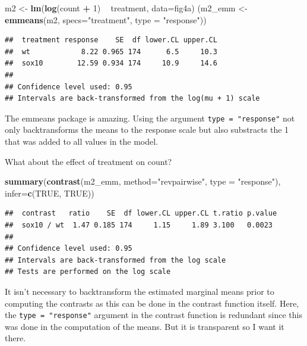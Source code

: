 \documentclass[]{book}
\newenvironment{Shaded}{\begin{snugshade}}{\end{snugshade}}
\newcommand{\DataTypeTok}[1]{\textcolor[rgb]{0.13,0.29,0.53}{#1}}
\newcommand{\DecValTok}[1]{\textcolor[rgb]{0.00,0.00,0.81}{#1}}
\newcommand{\KeywordTok}[1]{\textcolor[rgb]{0.13,0.29,0.53}{\textbf{#1}}}
\newcommand{\NormalTok}[1]{#1}
\newcommand{\OperatorTok}[1]{\textcolor[rgb]{0.81,0.36,0.00}{\textbf{#1}}}
\newcommand{\OtherTok}[1]{\textcolor[rgb]{0.56,0.35,0.01}{#1}}
\newcommand{\StringTok}[1]{\textcolor[rgb]{0.31,0.60,0.02}{#1}}
\begin{document}
\begin{Shaded}
\begin{Highlighting}[]
\NormalTok{m2 <-}\StringTok{ }\KeywordTok{lm}\NormalTok{(}\KeywordTok{log}\NormalTok{(count }\OperatorTok{+}\StringTok{ }\DecValTok{1}\NormalTok{) }\OperatorTok{~}\StringTok{ }\NormalTok{treatment, }\DataTypeTok{data=}\NormalTok{fig4a)}
\NormalTok{(m2_emm <-}\StringTok{ }\KeywordTok{emmeans}\NormalTok{(m2,}
                  \DataTypeTok{specs=}\StringTok{"treatment"}\NormalTok{,}
                  \DataTypeTok{type =} \StringTok{"response"}\NormalTok{))}
\end{Highlighting}
\end{Shaded}

\begin{verbatim}
##  treatment response    SE  df lower.CL upper.CL
##  wt            8.22 0.965 174      6.5     10.3
##  sox10        12.59 0.934 174     10.9     14.6
## 
## Confidence level used: 0.95 
## Intervals are back-transformed from the log(mu + 1) scale
\end{verbatim}

The emmeans package is amazing. Using the argument \texttt{type\ =\ "response"} not only backtransforms the means to the response scale but also substracts the 1 that was added to all values in the model.

What about the effect of treatment on count?

\begin{Shaded}
\begin{Highlighting}[]
\KeywordTok{summary}\NormalTok{(}\KeywordTok{contrast}\NormalTok{(m2_emm, }
                 \DataTypeTok{method=}\StringTok{"revpairwise"}\NormalTok{,}
                 \DataTypeTok{type =} \StringTok{"response"}\NormalTok{),}
        \DataTypeTok{infer=}\KeywordTok{c}\NormalTok{(}\OtherTok{TRUE}\NormalTok{, }\OtherTok{TRUE}\NormalTok{))}
\end{Highlighting}
\end{Shaded}

\begin{verbatim}
##  contrast   ratio    SE  df lower.CL upper.CL t.ratio p.value
##  sox10 / wt  1.47 0.185 174     1.15     1.89 3.100   0.0023 
## 
## Confidence level used: 0.95 
## Intervals are back-transformed from the log scale 
## Tests are performed on the log scale
\end{verbatim}

It isn't necessary to backtransform the estimated marginal means prior to computing the contrasts as this can be done in the contrast function itself. Here, the \texttt{type\ =\ "response"} argument in the contrast function is redundant since this was done in the computation of the means. But it is transparent so I want it there.
\end{document}
